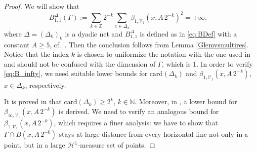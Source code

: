 \documentclass[12pt]{amsart}
\numberwithin{equation}{section}
\theoremstyle{plain}
\theoremstyle{definition}
\theoremstyle{remark}
\begin{document}
\begin{proof}
 We will show that 
 \begin{equation}\label{eq:B_infty}
     B_{1,1}^\Delta(\Gamma):=\sum_{k\in\mathbb Z}2^{-k}\sum_{x\in\Delta_k}\beta_{1,\mathcal V_1}(x, A\,2^{-k})^2=+\infty,
 \end{equation}
where $\Delta=(\Delta_k)_k$ is a dyadic net and $B_{1,1}^{\Delta}$ is defined as in \eqref{eq:BDef} with a constant $A\geq 5$, cf.\ \cite[(0.1)]{Juillet}. Then the conclusion follows from Lemma \ref{Glemvsmultires}. Notice that the index $k$ is chosen to uniformize the notation with the one used in \cite{Juillet} and should not be confused with the dimension of $\Gamma$, which is 1.
In order to verify \eqref{eq:B_infty}, we need suitable lower bounds for $\mathrm{card}(\Delta_k)$ and $\beta_{1,\mathcal V_1}(x, A\,2^{-k})$, $x\in \Delta_k$, respectively. 


 It is proved in \cite[\S 4]{Juillet} that $\mathrm{card}(\Delta_k)\geq 2^k$, $k\in \mathbb{N}$.
 Moreover, in \cite[(4.1)]{Juillet}, a lower bound for $\beta_{\infty,\mathcal V_1}(x, A\,2^{-k})$ is derived. We need to verify an analogous bound for $\beta_{1,\mathcal V_1}(x, A\,2^{-k})$, which requires a finer analysis: we have to show that  $\Gamma\cap B(x, A\,2^{-k})$ stays at large distance from every horizontal line not only in a point, but in a large $\mathcal{H}^1$-measure set of points.
 

\end{proof}
\end{document}
